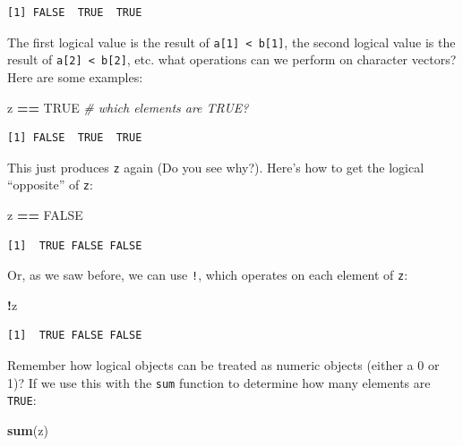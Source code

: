 \documentclass[
]{article}
\newenvironment{Shaded}{\begin{snugshade}}{\end{snugshade}}
\newcommand{\CommentTok}[1]{\textcolor[rgb]{0.56,0.35,0.01}{\textit{#1}}}
\newcommand{\KeywordTok}[1]{\textcolor[rgb]{0.13,0.29,0.53}{\textbf{#1}}}
\newcommand{\NormalTok}[1]{#1}
\newcommand{\OperatorTok}[1]{\textcolor[rgb]{0.81,0.36,0.00}{\textbf{#1}}}
\newcommand{\OtherTok}[1]{\textcolor[rgb]{0.56,0.35,0.01}{#1}}
\newcommand{\StringTok}[1]{\textcolor[rgb]{0.31,0.60,0.02}{#1}}
\begin{document}
\begin{verbatim}
[1] FALSE  TRUE  TRUE
\end{verbatim}

The first logical value is the result of \texttt{a{[}1{]}\ \textless{}\ b{[}1{]}}, the second logical value is the result of \texttt{a{[}2{]}\ \textless{}\ b{[}2{]}}, etc.
what operations can we perform on character vectors?
Here are some examples:

\begin{Shaded}
\begin{Highlighting}[]
\NormalTok{z }\OperatorTok{==}\StringTok{ }\OtherTok{TRUE}   \CommentTok{# which elements are TRUE?}
\end{Highlighting}
\end{Shaded}

\begin{verbatim}
[1] FALSE  TRUE  TRUE
\end{verbatim}

This just produces \texttt{z} again (Do you see why?).
Here's how to get the logical ``opposite'' of \texttt{z}:

\begin{Shaded}
\begin{Highlighting}[]
\NormalTok{z }\OperatorTok{==}\StringTok{ }\OtherTok{FALSE}
\end{Highlighting}
\end{Shaded}

\begin{verbatim}
[1]  TRUE FALSE FALSE
\end{verbatim}

Or, as we saw before, we can use \texttt{!}, which operates on each element of \texttt{z}:

\begin{Shaded}
\begin{Highlighting}[]
\OperatorTok{!}\NormalTok{z}
\end{Highlighting}
\end{Shaded}

\begin{verbatim}
[1]  TRUE FALSE FALSE
\end{verbatim}

Remember how logical objects can be treated as numeric objects (either a 0 or 1)?
If we use this with the \texttt{sum} function to determine how many elements are \texttt{TRUE}:

\begin{Shaded}
\begin{Highlighting}[]
\KeywordTok{sum}\NormalTok{(z)}
\end{Highlighting}
\end{Shaded}
\end{document}
